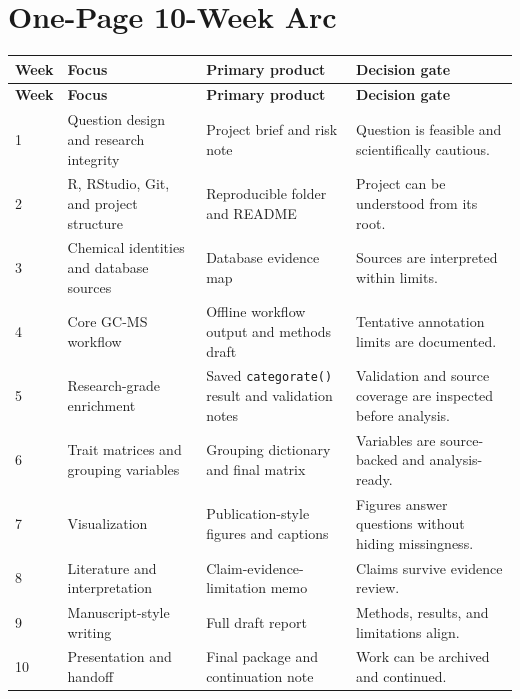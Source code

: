 \section*{One-Page 10-Week Arc}
\begin{longtable}{p{}p{}p{}p{}}
\toprule
\textbf{Week} & \textbf{Focus} & \textbf{Primary product} & \textbf{Decision gate}\\
\midrule
\endfirsthead
\toprule
\textbf{Week} & \textbf{Focus} & \textbf{Primary product} & \textbf{Decision gate}\\
\midrule
\endhead
1 & Question design and research integrity & Project brief and risk note & Question is feasible and scientifically cautious.\\
2 & R, RStudio, Git, and project structure & Reproducible folder and README & Project can be understood from its root.\\
3 & Chemical identities and database sources & Database evidence map & Sources are interpreted within limits.\\
4 & Core GC-MS workflow & Offline workflow output and methods draft & Tentative annotation limits are documented.\\
5 & Research-grade enrichment & Saved \texttt{categorate()} result and validation notes & Validation and source coverage are inspected before analysis.\\
6 & Trait matrices and grouping variables & Grouping dictionary and final matrix & Variables are source-backed and analysis-ready.\\
7 & Visualization & Publication-style figures and captions & Figures answer questions without hiding missingness.\\
8 & Literature and interpretation & Claim-evidence-limitation memo & Claims survive evidence review.\\
9 & Manuscript-style writing & Full draft report & Methods, results, and limitations align.\\
10 & Presentation and handoff & Final package and continuation note & Work can be archived and continued.\\
\bottomrule
\end{longtable}

